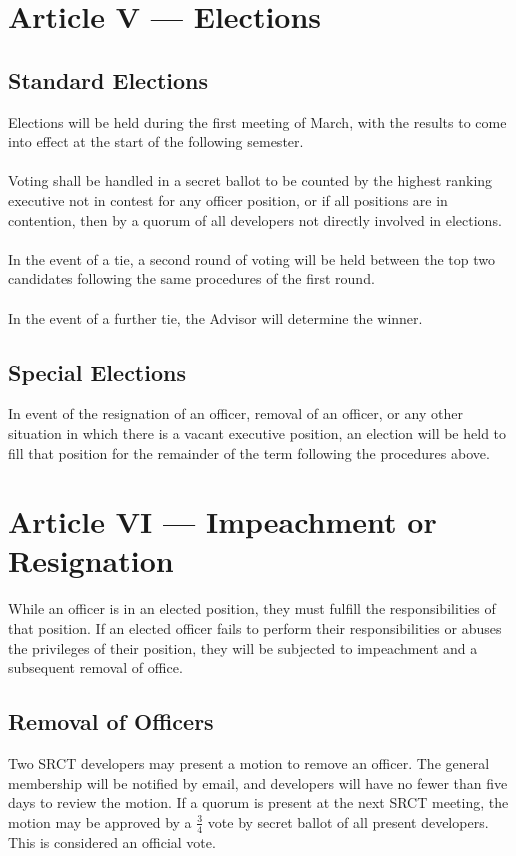 \documentclass{article}
\begin{document}
  \section{Article V --- Elections}
  \subsection{Standard Elections}
  Elections will be held during the first meeting of March, with the
  results to come into effect at the start of the following semester.
  \\ \\
  Voting shall be handled in a secret ballot to be counted by the 
  highest ranking executive not in contest for any officer position, or if
  all positions are in contention, then by a quorum of all developers
  not directly involved in elections.
  \\ \\
  In the event of a tie, a second round of voting will be held between 
  the top two candidates following the same procedures of the first 
  round.
  \\ \\
  In the event of a further tie, the Advisor will determine the winner.
  
  \subsection{Special Elections}
  In event of the resignation of an officer, removal of an officer, or 
  any other situation in which there is a vacant executive position,
  an election will be held to fill that position for the remainder of 
  the term following the procedures above.


  \section{Article VI --- Impeachment or Resignation}
  While an officer is in an elected position, they must fulfill the 
  responsibilities of that position. If an elected officer fails to 
  perform their responsibilities or abuses the privileges of their 
  position, they will be subjected to impeachment and a subsequent 
  removal of office.
  
  \subsection{Removal of Officers}
  Two SRCT developers may present a motion to remove an officer. The general
  membership will be notified by email, and developers will have no fewer
  than five days to review the motion. If a quorum is present at the next
  SRCT meeting, the motion may be approved by a $\frac{3}{4}$ vote by secret 
  ballot of all present developers. This is considered an official vote.
\end{document}
